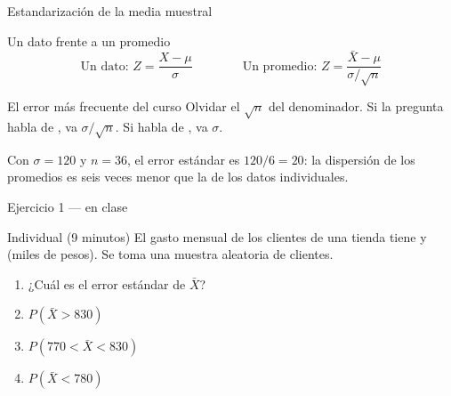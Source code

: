 \documentclass[aspectratio=169,10pt]{beamer}
\begin{document}
\begin{frame}{Estandarización de la media muestral}
  \begin{block}{Un dato frente a un promedio}
    \[ \text{Un dato: } Z=\frac{X-\mu}{\sigma}
       \qquad\qquad
       \text{Un promedio: } Z=\frac{\bar{X}-\mu}{\sigma/\sqrt{n}} \]
  \end{block}

  \vspace{0.25cm}
  \begin{alertblock}{El error más frecuente del curso}
    \footnotesize
    Olvidar el $\sqrt{n}$ del denominador. Si la pregunta habla de
    , va
    $\sigma/\sqrt{n}$. Si habla de , va $\sigma$.
  \end{alertblock}

  \vspace{0.2cm}
  {\footnotesize\color{uniGris} Con $\sigma=120$ y $n=36$, el error estándar es
  $120/6=20$: la dispersión de los promedios es seis veces menor que la de los
  datos individuales.}
\end{frame}

\begin{frame}{Ejercicio 1 — en clase}
  \begin{alertblock}{Individual (9 minutos)}
    El gasto mensual de los clientes de una tienda tiene
     y  (miles de pesos). Se toma
    una muestra aleatoria de  clientes.

    \vspace{0.25cm}
    \begin{enumerate}
      \item ¿Cuál es el error estándar de $\bar{X}$?
      \item $P(\bar{X}>830)$
      \item $P(770<\bar{X}<830)$
      \item $P(\bar{X}<780)$
    \end{enumerate}
  \end{alertblock}
\end{frame}
\end{document}
